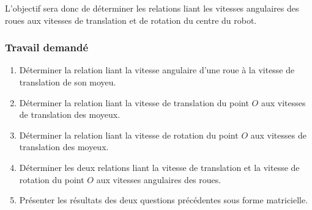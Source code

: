L'objectif sera donc de déterminer les relations liant les vitesses angulaires des roues aux vitesses de translation et de rotation du centre du robot.

\subsubsection{Travail demandé}
\begin{enumerate}
\item Déterminer la relation liant la vitesse angulaire d'une roue à la vitesse de translation de son moyeu.
\item Déterminer la relation liant la vitesse de translation du point $O$ aux vitesses de translation des moyeux.
\item Déterminer la relation liant la vitesse de rotation du point $O$ aux vitesses de translation des moyeux.
\item Déterminer les deux relations liant la vitesse de translation et la vitesse de rotation du point $O$ aux vitesses angulaires des roues.
\item Présenter les résultats des deux questions précédentes sous forme matricielle.
\end{enumerate}

\correction{ %
\begin{enumerate}
\item \[v_d=-R\dot{\varphi_d}\]
\[v_g=R\dot{\varphi_g}\]
\item \[v=\frac{v_g+v_d}{2}\]
\item \[\omega=\frac{v_d-v_g}{2L}\]
\item \[v=R\frac{\dot{\varphi_g}-\dot{\varphi_d}}{2}\]
\[\omega=-R\frac{\dot{\varphi_d}+\dot{\varphi_g}}{2L}\]
\item \[\left( \begin{array}{c} v \\ \omega \end{array} \right)=-\frac{R}{2} \left( \begin{array}{cc} 1 & -1 \\
\frac{1}{L} & \frac{1}{L} \end{array} \right)
\left( \begin{array}{c} \dot{\varphi_d} \\ \dot{\varphi_g} \end{array} \right)\]

\end{enumerate}
}
\newpage


